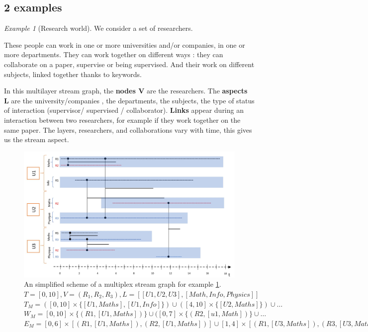 \documentclass[dvipsnames,a4paper,11pt]{article}
\theoremstyle{definition}
\theoremstyle{remark}
\theoremstyle{remark}
\newtheorem{ex}{Example}
\begin{document}
	\subsection{2 examples}
	\begin{ex}[Research world]\label{exresearch}
	We consider a set of researchers.
	
	These people can work in one or more universities and/or companies, in one or more departments. They can work together on different ways : they can collaborate on a paper, supervise or being supervised. And their work on different subjects, linked together thanks to keywords.


	In this multilayer stream graph, the {\bf nodes V} are the researchers. The {\bf aspects L} are the university/companies , the departments, the subjects, the type of status of interaction (supervisor/ supervised / collaborator). {\bf Links} appear during an interaction between two researchers, for example if they work together on the same paper. The layers, researchers, and collaborations vary with time, this gives us the stream aspect.
	
	\end{ex}
	
	\begin{figure}[h]
    	\centering
    	\includegraphics[width=15cm]{schemas/chercheurs.jpg}
    	\caption{An simplified scheme of a multiplex stream graph for example \ref{exresearch}.\newline
    	$T=[0,10], V=(R_1,R_2,R_3), L = [[U1,U2,U3],[Math,Info,Physics]]$\newline
    	$T_M=([0,10]\times\{[U1,Maths],[U1,Info]\})\cup([4,10]\times\{[U2,Maths]\})\cup\dots$\newline
    	$W_M=[0,10]\times \{(R1,[U1,Maths])\}\cup ([0,7]\times \{(R2,[u1,Math])\}\cup\dots $\newline
    	$E_M = [0,6]\times[(R1,[U1,Maths]),(R2,[U1,Maths])] \cup [1,4]\times [(R1,[U3,Maths]),(R3,[U3,Maths])] \cup \dots$}
    	\label{fig:chercheurs}
	\end{figure}
	
\end{document}
